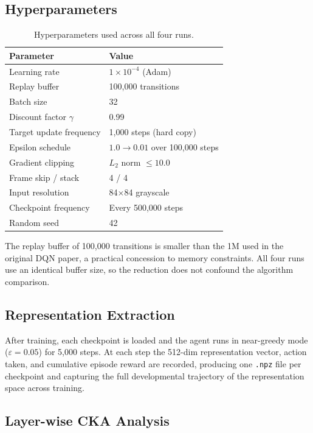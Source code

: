 \documentclass[a4paper]{article}
\begin{document}
\subsection{Hyperparameters}

\begin{table}[H]
\centering
\caption{Hyperparameters used across all four runs.}
\label{tab:hyperparams}
\begin{tabularx}{\linewidth}{lX}
\toprule
\textbf{Parameter} & \textbf{Value} \\
\midrule
Learning rate            & $1 \times 10^{-4}$ (Adam) \\
Replay buffer            & 100,000 transitions \\
Batch size               & 32 \\
Discount factor $\gamma$ & 0.99 \\
Target update frequency  & 1,000 steps (hard copy) \\
Epsilon schedule         & $1.0 \to 0.01$ over 100,000 steps \\
Gradient clipping        & $L_2$ norm $\leq 10.0$ \\
Frame skip / stack       & 4 / 4 \\
Input resolution         & 84$\times$84 grayscale \\
Checkpoint frequency     & Every 500,000 steps \\
Random seed              & 42 \\
\bottomrule
\end{tabularx}
\end{table}

The replay buffer of 100,000 transitions is smaller than the 1M used in the original DQN paper, a practical concession to memory constraints. All four runs use an identical buffer size, so the reduction does not confound the algorithm comparison.

\subsection{Representation Extraction}

After training, each checkpoint is loaded and the agent runs in near-greedy mode ($\varepsilon = 0.05$) for 5,000 steps. At each step the 512-dim representation vector, action taken, and cumulative episode reward are recorded, producing one \texttt{.npz} file per checkpoint and capturing the full developmental trajectory of the representation space across training.

\subsection{Layer-wise CKA Analysis}
\end{document}
